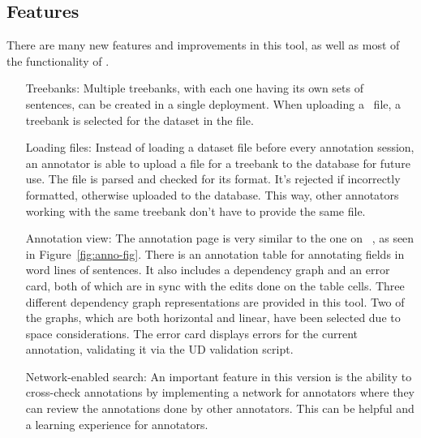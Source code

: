 \subsection{Features}
\label{sec:features}

There are many new features and improvements in this tool, as well as most of the functionality of \boatvone.

\begin{itemize}[before=\normalfont, font=\itshape, align=left]
    \item[Treebanks:]
        Multiple treebanks, with each one having its own sets of sentences, can be created in a single deployment.
        When uploading a \conllu\ file, a treebank is selected for the dataset in the file.

    \item[Loading files:]
        Instead of loading a dataset file before every annotation session, an annotator is able to upload a \conllu file for a treebank to the database for future use.
        The file is parsed and checked for its format. It's rejected if incorrectly formatted, otherwise uploaded to the database.
        This way, other annotators working with the same treebank don't have to provide the same file.

    \item[Annotation view:]
        The annotation page is very similar to the one on \boatvone~\cite{trk2020resources}, as seen in Figure~\ref{fig:anno-fig}.
        There is an annotation table for annotating fields in word lines of sentences.
        It also includes a dependency graph and an error card, both of which are in sync with the edits done on the table cells.
        Three different dependency graph representations are provided in this tool.
        Two of the graphs, which are both horizontal and linear, have been selected due to space considerations.
        The error card displays errors for the current annotation, validating it via the UD validation script.

    \item[Network-enabled search:]
        An important feature in this version is the ability to cross-check annotations by implementing a network for annotators where they can review the annotations done by other annotators.
        This can be helpful and a learning experience for annotators.


\end{itemize}
